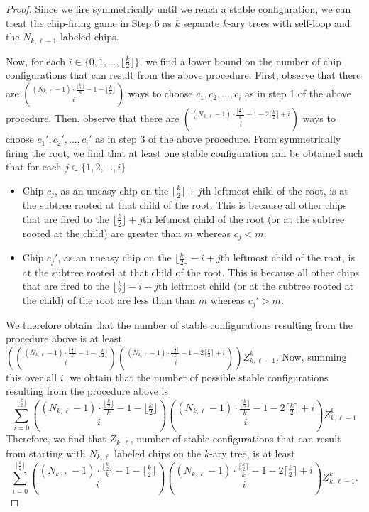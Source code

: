 \documentclass[11pt]{article}
\theoremstyle{remark}
\theoremstyle{definition}
\begin{document}
\begin{proof}
Since we fire symmetrically until we reach a stable configuration, we can treat the chip-firing game in Step 6 as $k$ separate $k$-ary trees with self-loop and the $N_{k, \ell-1}$ labeled chips.

Now, for each $i \in \{0, 1, \dots, \lfloor \frac k 2 \rfloor\}$, we find a lower bound on the number of chip configurations that can result from the above procedure. First, observe that there are $\binom{(N_{k, \ell}-1) \cdot \frac{\lfloor \frac{k}{2} \rfloor}{k} -1-\lfloor \frac{k}{2}  \rfloor}{i}$ ways to choose $c_1, c_2, \dots, c_i$ as in step 1 of the above procedure. Then, observe that there are $\binom{(N_{k, \ell}-1) \cdot \frac{\lceil \frac{k}{2} \rceil}{k} -1-2\lceil \frac{k}{2}  \rceil+i}{i}$ ways to choose $c_1', c_2', \dots, c_i'$ as in step 3 of the above procedure. From symmetrically firing the root, we find that at least one stable configuration can be obtained such that for each $j \in \{1, 2, \dots, i\}$
\begin{itemize}
 \item Chip $c_j$, as an uneasy chip on the $\lfloor \frac{k}{2} \rfloor + j$th leftmost child of the root, is at the subtree rooted at that child of the root. This is because all other chips that are fired to the $\lfloor \frac{k}{2} \rfloor + j$th leftmost child of the root (or at the subtree rooted at the child) are greater than $m$ whereas $c_j < m$.
    \item Chip $c_j'$, as an uneasy chip on the $\lfloor \frac{k}{2} \rfloor - i + j$th leftmost child of the root, is at the subtree rooted at that child of the root. This is because all other chips that are fired to the $\lfloor \frac{k}{2} \rfloor -i+ j$th leftmost child (or at the subtree rooted at the child) of the root are less than than $m$ whereas $c_j' > m$.
\end{itemize} We therefore obtain that the number of stable configurations resulting from the procedure above is at least $(\binom{(N_{k, \ell}-1) \cdot \frac{\lfloor \frac{k}{2} \rfloor}{k} -1-\lfloor \frac{k}{2}  \rfloor}{i} \binom{(N_{k, \ell}-1) \cdot \frac{\lceil \frac{k}{2} \rceil}{k} -1-2\lceil \frac{k}{2}  \rceil+i}{i})Z_{k, \ell-1}^{k}$. Now, summing this over all $i$, we obtain that the number of possible stable configurations resulting from the procedure above is $$\sum_{i=0}^{\lfloor \frac{k}{2} \rfloor}\binom{(N_{k, \ell}-1) \cdot \frac{\lfloor \frac{k}{2} \rfloor}{k} -1-\lfloor \frac{k}{2}  \rfloor}{i} \binom{(N_{k, \ell}-1) \cdot \frac{\lceil \frac{k}{2} \rceil}{k} -1-2\lceil \frac{k}{2}  \rceil+i}{i}Z_{k, \ell-1}^{k}$$ Therefore, we find that $Z_{k,\ell}$, number of stable configurations that can result from starting with $N_{k, \ell}$ labeled chips on the $k$-ary tree, is at least $$\sum_{i=0}^{\lfloor \frac{k}{2} \rfloor}\binom{(N_{k, \ell}-1) \cdot \frac{\lfloor \frac{k}{2} \rfloor}{k} -1-\lfloor \frac{k}{2}  \rfloor}{i} \binom{(N_{k, \ell}-1) \cdot \frac{\lceil \frac{k}{2} \rceil}{k} -1-2\lceil \frac{k}{2}  \rceil+i}{i}Z_{k, \ell-1}^{k}.$$
\end{proof}
\end{document}
